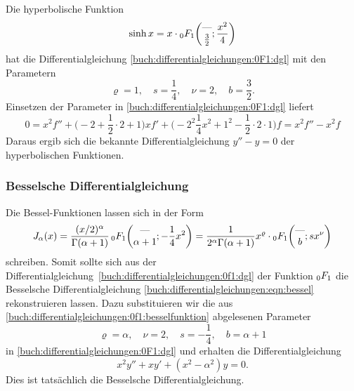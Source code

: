 \begin{beispiel}
Die hyperbolische Funktion
\[
\sinh x
=
x\cdot \mathstrut_0F_1\biggl(
\begin{matrix}\text{---}\\\frac32\end{matrix};\frac{x^2}{4}
\biggr)
\]
hat die Differentialgleichung
\eqref{buch:differentialgleichungen:0F1:dgl}
mit den Parametern
\[
\varrho=1,\quad
s=\frac14,\quad
\nu=2,\quad
b=\frac32.
\]
Einsetzen der Parameter in
\eqref{buch:differentialgleichungen:0F1:dgl}
liefert
\[
0
=
x^2f''
+
\biggl(-2+\frac12\cdot 2 + 1\biggr) xf'
+
\biggl(-2^2\frac14x^2 + 1^2 - \frac12 \cdot 2 \cdot 1\biggr) f
=
x^2f''
-x^2f
\]
Daraus ergib sich die bekannte Differentialgleichung
$y''-y=0$
der hyperbolischen Funktionen.
\end{beispiel}

%
%
\subsubsection{Besselsche Differentialgleichung}
Die Bessel-Funktionen lassen sich in der Form
\begin{equation}
J_\alpha(x)
=
\frac{(x/2)^\alpha}{\Gamma(\alpha+1)} \,
\mathstrut_0F_1\biggl(
\begin{matrix}\text{---}\\\alpha+1\end{matrix};-\frac14x^2
\biggr)
=
\frac{1}{2^\alpha\Gamma(\alpha+1)}
x^\varrho\cdot
\mathstrut_0F_1\biggl(
\begin{matrix}\text{---}\\b\end{matrix};sx^\nu
\biggr)
\label{buch:differentialgleichungen:0f1:besselfunktion}
\end{equation}
schreiben.
Somit sollte sich aus der
Differentialgleichung~\eqref{buch:differentialgleichungen:0f1:dgl}
der Funktion $\mathstrut_0F_1$ die Besselsche Differentialgleichung
\eqref{buch:differentialgleichungen:eqn:bessel} rekonstruieren lassen.
Dazu substituieren wir die aus
\eqref{buch:differentialgleichungen:0f1:besselfunktion}
abgelesenen Parameter
\[
\varrho=\alpha,\quad\nu=2,\quad s=-\frac14,\quad b=\alpha+1
\]
in \eqref{buch:differentialgleichungen:0F1:dgl} und erhalten
die Differentialgleichung
\begin{equation}
x^2y''
+
xy'
+
(x^2 - \alpha^2)y
=
0.
\label{buch:differentialgleichungen:0F1:besseldgl}
\end{equation}
Dies ist tatsächlich die Besselsche Differentialgleichung.

